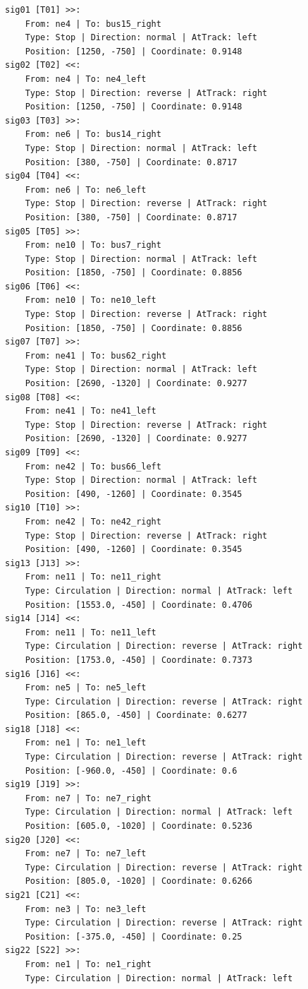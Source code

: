 	\begin{lstlisting}[language = {}, caption = Signalling.RNA, label = {lst:EJ6_6}]
sig01 [T01] >>:
	From: ne4 | To: bus15_right
	Type: Stop | Direction: normal | AtTrack: left 
	Position: [1250, -750] | Coordinate: 0.9148
sig02 [T02] <<:
	From: ne4 | To: ne4_left
	Type: Stop | Direction: reverse | AtTrack: right 
	Position: [1250, -750] | Coordinate: 0.9148
sig03 [T03] >>:
	From: ne6 | To: bus14_right
	Type: Stop | Direction: normal | AtTrack: left 
	Position: [380, -750] | Coordinate: 0.8717
sig04 [T04] <<:
	From: ne6 | To: ne6_left
	Type: Stop | Direction: reverse | AtTrack: right 
	Position: [380, -750] | Coordinate: 0.8717
sig05 [T05] >>:
	From: ne10 | To: bus7_right
	Type: Stop | Direction: normal | AtTrack: left 
	Position: [1850, -750] | Coordinate: 0.8856
sig06 [T06] <<:
	From: ne10 | To: ne10_left
	Type: Stop | Direction: reverse | AtTrack: right 
	Position: [1850, -750] | Coordinate: 0.8856
sig07 [T07] >>:
	From: ne41 | To: bus62_right
	Type: Stop | Direction: normal | AtTrack: left 
	Position: [2690, -1320] | Coordinate: 0.9277
sig08 [T08] <<:
	From: ne41 | To: ne41_left
	Type: Stop | Direction: reverse | AtTrack: right 
	Position: [2690, -1320] | Coordinate: 0.9277
sig09 [T09] <<:
	From: ne42 | To: bus66_left
	Type: Stop | Direction: normal | AtTrack: left 
	Position: [490, -1260] | Coordinate: 0.3545
sig10 [T10] >>:
	From: ne42 | To: ne42_right
	Type: Stop | Direction: reverse | AtTrack: right 
	Position: [490, -1260] | Coordinate: 0.3545
sig13 [J13] >>:
	From: ne11 | To: ne11_right
	Type: Circulation | Direction: normal | AtTrack: left 
	Position: [1553.0, -450] | Coordinate: 0.4706
sig14 [J14] <<:
	From: ne11 | To: ne11_left
	Type: Circulation | Direction: reverse | AtTrack: right 
	Position: [1753.0, -450] | Coordinate: 0.7373
sig16 [J16] <<:
	From: ne5 | To: ne5_left
	Type: Circulation | Direction: reverse | AtTrack: right 
	Position: [865.0, -450] | Coordinate: 0.6277
sig18 [J18] <<:
	From: ne1 | To: ne1_left
	Type: Circulation | Direction: reverse | AtTrack: right 
	Position: [-960.0, -450] | Coordinate: 0.6
sig19 [J19] >>:
	From: ne7 | To: ne7_right
	Type: Circulation | Direction: normal | AtTrack: left 
	Position: [605.0, -1020] | Coordinate: 0.5236
sig20 [J20] <<:
	From: ne7 | To: ne7_left
	Type: Circulation | Direction: reverse | AtTrack: right 
	Position: [805.0, -1020] | Coordinate: 0.6266
sig21 [C21] <<:
	From: ne3 | To: ne3_left
	Type: Circulation | Direction: reverse | AtTrack: right 
	Position: [-375.0, -450] | Coordinate: 0.25
sig22 [S22] >>:
	From: ne1 | To: ne1_right
	Type: Circulation | Direction: normal | AtTrack: left 

\end{lstlisting}
